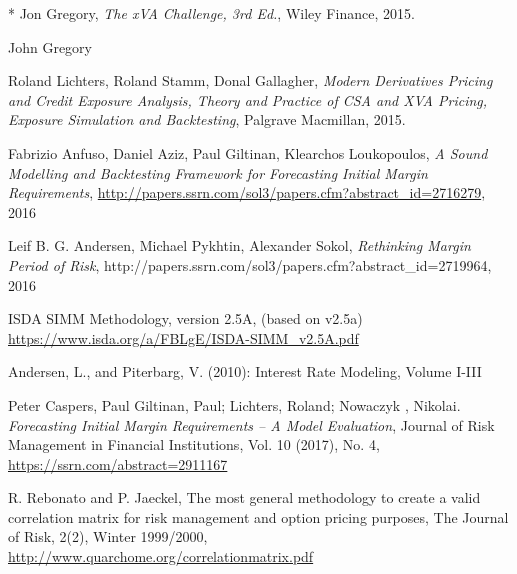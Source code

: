 \begin{thebibliography}{*}
 Jon Gregory, {\em The xVA Challenge, 3rd Ed.}, Wiley Finance, 2015.

 John Gregory

 Roland Lichters, Roland Stamm, Donal Gallagher, {\em Modern Derivatives Pricing and Credit Exposure
    Analysis, Theory and Practice of CSA and XVA Pricing, Exposure Simulation and Backtesting}, Palgrave Macmillan,
  2015.

 Fabrizio Anfuso, Daniel Aziz, Paul Giltinan, Klearchos Loukopoulos, {\em A Sound Modelling and
    Backtesting Framework for Forecasting Initial Margin Requirements},
  \url{http://papers.ssrn.com/sol3/papers.cfm?abstract_id=2716279}, 2016

 Leif B. G. Andersen, Michael Pykhtin, Alexander Sokol, {\em Rethinking Margin Period of Risk},
  http://papers.ssrn.com/sol3/papers.cfm?abstract\_id=2719964, 2016

 ISDA SIMM Methodology, version 2.5A, (based on v2.5a) \\
  \url{https://www.isda.org/a/FBLgE/ISDA-SIMM\_v2.5A.pdf}




 Andersen, L., and Piterbarg, V. (2010): Interest Rate Modeling, Volume I-III

 Peter Caspers, Paul Giltinan, Paul; Lichters, Roland; Nowaczyk , Nikolai. {\em Forecasting Initial Margin Requirements – A Model Evaluation}, Journal of Risk Management in Financial Institutions, Vol. 10 (2017), No. 4, \url{https://ssrn.com/abstract=2911167}

 R. Rebonato and P. Jaeckel, The most general methodology to create a valid correlation matrix for
  risk management and option pricing purposes, The Journal of Risk, 2(2), Winter 1999/2000,
  \url{http://www.quarchome.org/correlationmatrix.pdf}


\end{thebibliography}
